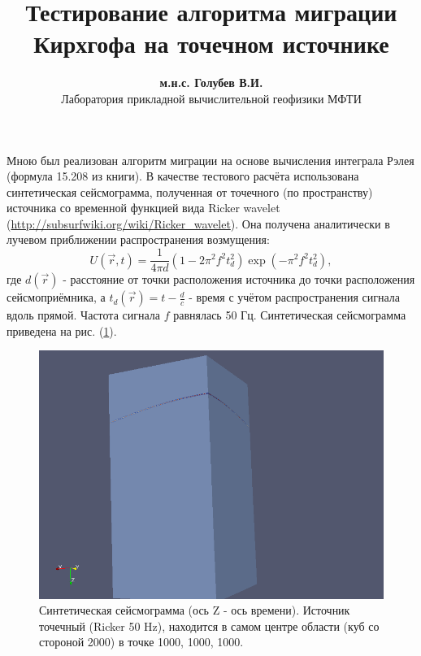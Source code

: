 \documentclass{article}
\begin{document}
\title{Тестирование алгоритма миграции Кирхгофа на точечном источнике}
\author{\textbf{м.н.с. Голубев В.И.} \\ Лаборатория прикладной вычислительной геофизики МФТИ}
\maketitle

Мною был реализован алгоритм миграции на основе вычисления интеграла Рэлея (формула 15.208 из книги).
В качестве тестового расчёта использована синтетическая сейсмограмма, полученная от точечного (по пространству) источника со временной функцией
вида Ricker wavelet (\url{http://subsurfwiki.org/wiki/Ricker_wavelet}). Она получена аналитически в лучевом приближении распространения возмущения:
\begin{equation}
\label{eq_seismogram_ricker}
U(\vec{r}, t) = \frac{1}{4\pi d}(1 - 2\pi^2f^2t^2_d)\exp(-\pi^2f^2t^2_d),
\end{equation}
где $d(\vec{r})$ - расстояние от точки расположения источника до точки расположения сейсмоприёмника, а $t_d(\vec{r}) = t - \frac{d}{c}$ - время с учётом распространения сигнала вдоль прямой.
Частота сигнала $f$ равнялась 50 Гц.
Синтетическая сейсмограмма приведена на рис. (\ref{img_seismogram_ricker}).
\begin{figure}[ht]
  \center
  \includegraphics[scale=0.5]{pic/point_source_input_1000_1000_1000.png}
  \caption{Синтетическая сейсмограмма (ось Z - ось времени). Источник точечный (Ricker 50 Hz), находится в самом центре области (куб со стороной 2000)  в точке 1000, 1000, 1000.}
\label{img_seismogram_ricker}
\end{figure}
\end{document}
